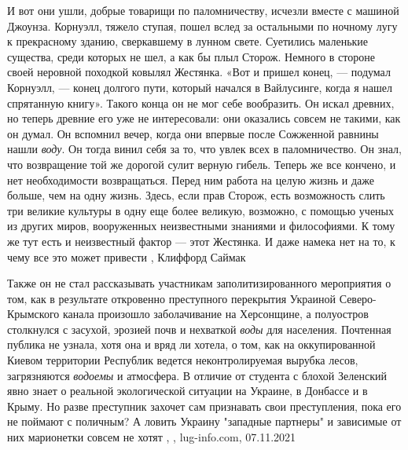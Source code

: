 И вот они ушли, добрые товарищи по паломничеству, исчезли вместе с машиной
Джоунза.  Корнуэлл, тяжело ступая, пошел вслед за остальными по ночному лугу к
прекрасному зданию, сверкавшему в лунном свете. Суетились маленькие существа,
среди которых не шел, а как бы плыл Сторож. Немного в стороне своей неровной
походкой ковылял Жестянка.  «Вот и пришел конец, — подумал Корнуэлл, — конец
долгого пути, который начался в Вайлусинге, когда я нашел спрятанную книгу».
Такого конца он не мог себе вообразить. Он искал древних, но теперь древние его
уже не интересовали: они оказались совсем не такими, как он думал.  Он вспомнил
вечер, когда они впервые после Сожженной равнины нашли \emph{воду}. Он тогда винил
себя за то, что увлек всех в паломничество. Он знал, что возвращение той же
дорогой сулит верную гибель. Теперь же все кончено, и нет необходимости
возвращаться. Перед ним работа на целую жизнь и даже больше, чем на одну жизнь.
Здесь, если прав Сторож, есть возможность слить три великие культуры в одну еще
более великую, возможно, с помощью ученых из других миров, вооруженных
неизвестными знаниями и философиями. К тому же тут есть и неизвестный фактор —
этот Жестянка. И даже намека нет на то, к чему все это может привести
, Клиффорд Саймак

Также он не стал рассказывать участникам заполитизированного мероприятия о том,
как в результате откровенно преступного перекрытия Украиной Северо-Крымского
канала произошло заболачивание на Херсонщине, а полуостров столкнулся с
засухой, эрозией почв и нехваткой \emph{воды} для населения. Почтенная публика
не узнала, хотя она и вряд ли хотела, о том, как на оккупированной Киевом
территории Республик ведется неконтролируемая вырубка лесов, загрязняются
\emph{водоемы} и атмосфера. В отличие от студента с блохой Зеленский явно
знает о реальной экологической ситуации на Украине, в Донбассе и в Крыму. Но
разве преступник захочет сам признавать свои преступления, пока его не поймают
с поличным? А ловить Украину "западные партнеры" и зависимые от них марионетки
совсем не хотят
, 
, lug-info.com, 07.11.2021
